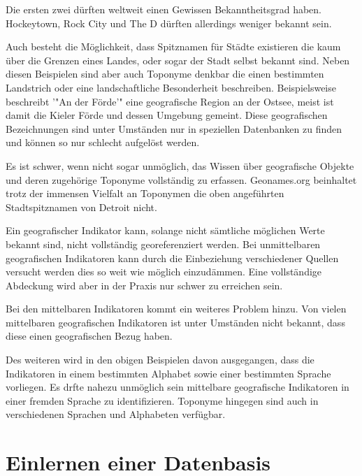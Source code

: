 					Die ersten zwei dürften weltweit einen Gewissen Bekanntheitsgrad haben. 
					Hockeytown, Rock City und The D dürften allerdings weniger bekannt sein.  
					
					Auch besteht die Möglichkeit, dass Spitznamen für Städte existieren die kaum über die Grenzen eines Landes, oder sogar der Stadt selbst bekannt sind. 
					Neben diesen Beispielen sind aber auch Toponyme denkbar die einen bestimmten Landstrich oder eine landschaftliche Besonderheit beschreiben.
					Beispielsweise beschreibt '"An der Förde'" eine geografische Region an der Ostsee, meist ist damit die Kieler Förde und dessen Umgebung gemeint. 
					Diese geografischen Bezeichnungen sind unter Umständen nur in speziellen Datenbanken zu finden und können so nur schlecht aufgelöst werden. 

					Es ist schwer, wenn nicht sogar unmöglich, das Wissen über geografische Objekte und deren zugehörige Toponyme vollständig zu erfassen.
					Geonames.org beinhaltet trotz der immensen Vielfalt an Toponymen die oben angeführten Stadtspitznamen von Detroit nicht.

					Ein geografischer Indikator kann, solange nicht sämtliche möglichen Werte bekannt sind, nicht vollständig georeferenziert werden.
					Bei unmittelbaren geografischen Indikatoren kann durch die Einbeziehung verschiedener Quellen versucht werden dies so weit wie möglich einzudämmen.
					Eine vollständige Abdeckung wird aber in der Praxis nur schwer zu erreichen sein.

					Bei den mittelbaren Indikatoren kommt ein weiteres Problem hinzu. 
					Von vielen mittelbaren geografischen Indikatoren ist unter Umständen nicht bekannt, dass diese einen geografischen Bezug haben.

					Des weiteren wird in den obigen Beispielen davon ausgegangen, dass die Indikatoren in einem bestimmten Alphabet sowie einer bestimmten Sprache vorliegen.
					Es drfte nahezu unmöglich sein mittelbare geografische Indikatoren in einer fremden Sprache zu identifizieren.
					Toponyme hingegen sind auch in verschiedenen Sprachen und Alphabeten verfügbar. 


	\section{Einlernen einer Datenbasis}

